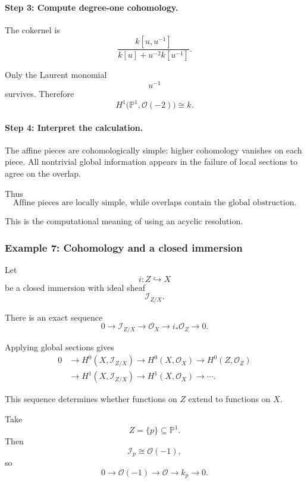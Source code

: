 \documentclass[12pt,a4paper]{article}
\theoremstyle{notespace}
\begin{document}
\paragraph{Step 3: Compute degree-one cohomology.}

The cokernel is
\[
\frac{k[u,u^{-1}]}
{k[u]+u^{-2}k[u^{-1}]}.
\]

Only the Laurent monomial
\[
u^{-1}
\]
survives. Therefore
\[
H^{1}\bigl(\mathbb{P}^{1},\mathcal{O}(-2)\bigr)
\cong
k.
\]

\paragraph{Step 4: Interpret the calculation.}

The affine pieces are cohomologically simple: higher cohomology vanishes on
each piece. All nontrivial global information appears in the failure of
local sections to agree on the overlap.

Thus
\[
\boxed{
	\text{Affine pieces are locally simple, while overlaps contain the global obstruction.}
}
\]

This is the computational meaning of using an acyclic resolution.

\subsubsection{Example 7: Cohomology and a closed immersion}

Let
\[
i:Z\hookrightarrow X
\]
be a closed immersion with ideal sheaf
\[
\mathcal{I}_{Z/X}.
\]

There is an exact sequence
\[
0
\longrightarrow
\mathcal{I}_{Z/X}
\longrightarrow
\mathcal{O}_{X}
\longrightarrow
i_{*}\mathcal{O}_{Z}
\longrightarrow
0.
\]

Applying global sections gives
\[
\begin{aligned}
	0
	&\longrightarrow
	H^{0}(X,\mathcal{I}_{Z/X})
	\longrightarrow
	H^{0}(X,\mathcal{O}_{X})
	\longrightarrow
	H^{0}(Z,\mathcal{O}_{Z}) \\
	&\longrightarrow
	H^{1}(X,\mathcal{I}_{Z/X})
	\longrightarrow
	H^{1}(X,\mathcal{O}_{X})
	\longrightarrow
	\cdots.
\end{aligned}
\]

This sequence determines whether functions on \(Z\) extend to functions on
\(X\).

Take
\[
Z=\{p\}\subseteq \mathbb{P}^{1}.
\]
Then
\[
\mathcal{I}_{p}\cong \mathcal{O}(-1),
\]
so
\[
0
\longrightarrow
\mathcal{O}(-1)
\longrightarrow
\mathcal{O}
\longrightarrow
k_{p}
\longrightarrow
0.
\]
\end{document}
